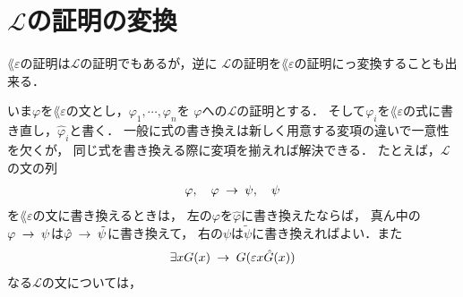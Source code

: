 \section{$\mathcal{L}$の証明の変換}
	$\lang{\varepsilon}$の証明は$\mathcal{L}$の証明でもあるが，逆に
	$\mathcal{L}$の証明を$\lang{\varepsilon}$の証明にっ変換することも出来る．
	
	いま$\varphi$を$\lang{\varepsilon}$の文とし，$\varphi_{1},\cdots,\varphi_{n}$を
	$\varphi$への$\mathcal{L}$の証明とする．
	そして$\varphi_{i}$を$\lang{\varepsilon}$の式に書き直し，$\hat{\varphi}_{i}$と書く．
	一般に式の書き換えは新しく用意する変項の違いで一意性を欠くが，
	同じ式を書き換える際に変項を揃えれば解決できる．
	たとえば，$\mathcal{L}$の文の列
	\begin{align}
		\varphi,\quad \varphi \hspace{0.25em}\rightarrow\hspace{0.25em} \psi,\quad \psi
	\end{align}
	を$\lang{\varepsilon}$の文に書き換えるときは，
	左の$\varphi$を$\hat{\varphi}$に書き換えたならば，
	真ん中の$\varphi \hspace{0.25em}\rightarrow\hspace{0.25em} \psi$は$\hat{\varphi} \hspace{0.25em}\rightarrow\hspace{0.25em} \tilde{\psi}$に書き換えて，
	右の$\psi$は$\tilde{\psi}$に書き換えればよい．また
	\begin{align}
		\exists x G(x) \hspace{0.25em}\rightarrow\hspace{0.25em} G(\varepsilon x \hat{G}(x))
	\end{align}
	なる$\mathcal{L}$の文については，
